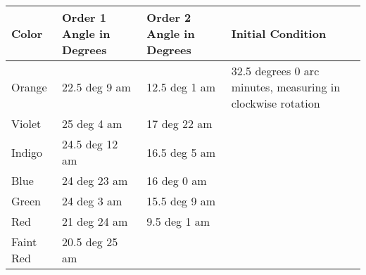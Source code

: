 \documentclass{article}
\begin{document}
\begin{table}[H]
\begin{tabular}{|l|l|l|l|}
\hline
Color     & Order 1 Angle in Degrees & Order 2 Angle in Degrees & Initial Condition                                           \\ \hline
Orange    & 22.5 deg 9 am            & 12.5 deg 1 am            & 32.5 degrees 0 arc minutes, measuring in clockwise rotation \\ \hline
Violet    & 25 deg 4 am              & 17 deg 22 am             &                                                             \\ \hline
Indigo    & 24.5 deg 12 am           & 16.5 deg 5 am            &                                                             \\ \hline
Blue      & 24 deg 23 am             & 16 deg 0 am              &                                                             \\ \hline
Green     & 24 deg 3 am              & 15.5 deg 9 am            &                                                             \\ \hline
Red       & 21 deg 24 am             & 9.5 deg 1 am             &                                                             \\ \hline
Faint Red & 20.5 deg 25 am           &                          &                                                             \\ \hline
\end{tabular}
\end{table}
\end{document}
